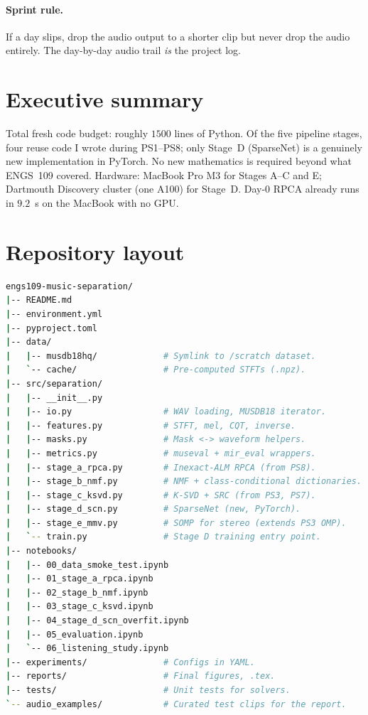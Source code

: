 \documentclass[10pt]{article}
\begin{document}
\paragraph{Sprint rule.} If a day slips, drop the audio output to a
shorter clip but never drop the audio entirely.  The day-by-day audio
trail \emph{is} the project log.

\section{Executive summary}
Total fresh code budget: roughly $1500$ lines of Python.  Of the five
pipeline stages, four reuse code I wrote during PS1--PS8; only
Stage~D (SparseNet) is a genuinely new implementation in PyTorch.
No new mathematics is required beyond what ENGS~109 covered.  Hardware:
MacBook Pro M3 for Stages A--C and E; Dartmouth Discovery cluster
(one A100) for Stage~D.  Day-0 RPCA already runs in $9.2$~s on the
MacBook with no GPU.

\section{Repository layout}
\begin{lstlisting}[language=bash]
engs109-music-separation/
|-- README.md
|-- environment.yml
|-- pyproject.toml
|-- data/
|   |-- musdb18hq/             # Symlink to /scratch dataset.
|   `-- cache/                 # Pre-computed STFTs (.npz).
|-- src/separation/
|   |-- __init__.py
|   |-- io.py                  # WAV loading, MUSDB18 iterator.
|   |-- features.py            # STFT, mel, CQT, inverse.
|   |-- masks.py               # Mask <-> waveform helpers.
|   |-- metrics.py             # museval + mir_eval wrappers.
|   |-- stage_a_rpca.py        # Inexact-ALM RPCA (from PS8).
|   |-- stage_b_nmf.py         # NMF + class-conditional dictionaries.
|   |-- stage_c_ksvd.py        # K-SVD + SRC (from PS3, PS7).
|   |-- stage_d_scn.py         # SparseNet (new, PyTorch).
|   |-- stage_e_mmv.py         # SOMP for stereo (extends PS3 OMP).
|   `-- train.py               # Stage D training entry point.
|-- notebooks/
|   |-- 00_data_smoke_test.ipynb
|   |-- 01_stage_a_rpca.ipynb
|   |-- 02_stage_b_nmf.ipynb
|   |-- 03_stage_c_ksvd.ipynb
|   |-- 04_stage_d_scn_overfit.ipynb
|   |-- 05_evaluation.ipynb
|   `-- 06_listening_study.ipynb
|-- experiments/               # Configs in YAML.
|-- reports/                   # Final figures, .tex.
|-- tests/                     # Unit tests for solvers.
`-- audio_examples/            # Curated test clips for the report.
\end{lstlisting}
\end{document}
